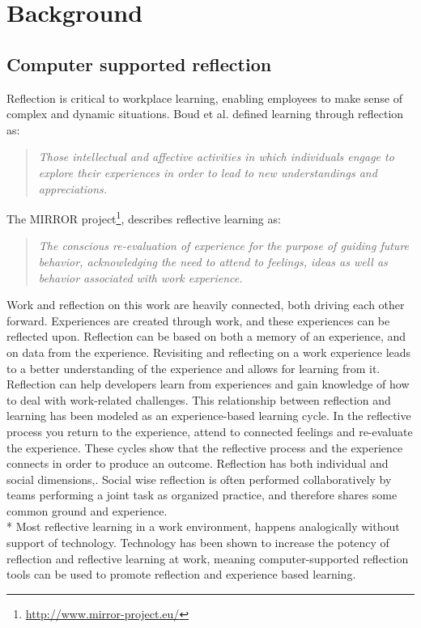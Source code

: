\chapter{Background}
\label{chap:background}
\section{Computer supported reflection}
Reflection is critical to workplace learning, enabling employees to make sense of complex and dynamic situations\cite{Schon1983}. Boud et al.\cite{boudreflection1985} defined learning through reflection as: 
\begin{quote}
\emph{Those intellectual and affective activities in which individuals engage to explore their experiences in order to lead to new understandings and appreciations.}
\end{quote}
The MIRROR project\footnote{\url{http://www.mirror-project.eu/}}, describes reflective learning as:
\begin{quote}
\emph{The conscious re-evaluation of experience for the purpose of guiding future behavior, acknowledging the need to attend to feelings, ideas as well as behavior associated with work experience.}\cite{krogstiemodel}
\end{quote}

Work and reflection on this work are heavily connected\cite{Schon1983}, both driving each other forward. Experiences are created through work, and these experiences can be reflected upon. Reflection can be based on both a memory of an experience, and on data from the experience. Revisiting and reflecting on a work experience leads to a better understanding of the experience and allows for learning from it. Reflection can help developers learn from experiences and gain knowledge of how to deal with work-related challenges. This relationship between reflection and learning has been modeled as an experience-based learning cycle\cite{boudreflection1985,Korthagen_Vasalos_2005, KolbModel}. In the reflective process you return to the experience, attend to connected feelings and re-evaluate
the experience. These cycles show that the reflective process and the experience connects in order to produce an outcome.
Reflection has both individual and social dimensions,\cite{Høyrup_2004,Woerkom_Croon_2008}. Social wise reflection is often performed collaboratively by teams performing a joint task as organized practice, and therefore shares some common ground and experience. \\*
Most reflective learning in a work environment, happens analogically without support of technology\cite{Schindler_Eppler_2003}. Technology has been shown to increase the potency of reflection and reflective learning at work, meaning computer-supported reflection tools can be used to promote reflection and experience based learning\cite{krogstiereflectionwork, Lin_Hmelo_Kinzer_Secules_1999,Xiao_Clark_Rosson_Carroll_2008}. 


